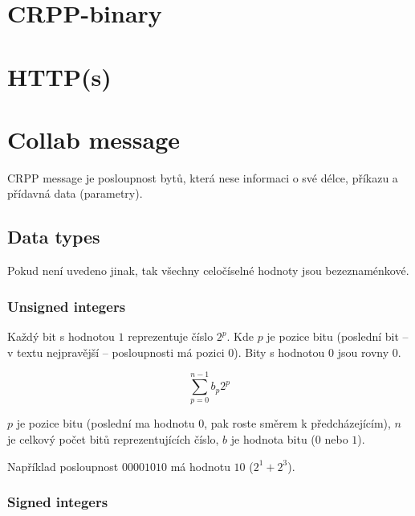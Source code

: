 \documentclass[12pt,oneside,a4paper]{report}
\begin{document}
\chapter{CRPP-binary}
\label{chapter.crpp-binary}


\chapter{HTTP(s)}
\label{chapter.http}


\chapter{Collab message}
\label{text.collab_message}

CRPP message je posloupnost bytů, která nese informaci o své délce, příkazu a přídavná data (parametry).

\section{Data types}

Pokud není uvedeno jinak, tak všechny celočíselné hodnoty jsou bezeznaménkové.

\subsection{Unsigned integers}
\label{subsection.unsigned-integers}

Každý bit s hodnotou $1$ reprezentuje číslo $2^{p}$. Kde $p$ je pozice bitu (poslední bit -- v textu nejpravější -- posloupnosti má pozici $0$). Bity s hodnotou $0$ jsou rovny $0$.

\begin{equation}
\label{equation.unsigned-integers-sum}
\sum_{p = 0}^{n - 1} b_p 2^p
\end{equation}

$p$ je pozice bitu (poslední ma hodnotu 0, pak roste směrem k předcházejícím), $n$ je celkový počet bitů reprezentujících číslo, $b$ je hodnota bitu ($0$ nebo $1$).

Například posloupnost $00001010$ má hodnotu $10$ ($2^1 + 2^3$).

\subsection{Signed integers}
\end{document}
